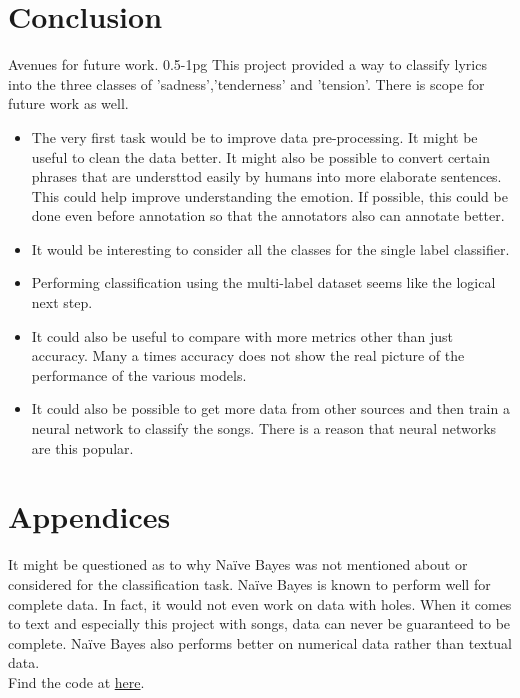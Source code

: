 \documentclass[11pt,a4paper]{article}
\begin{document}
\section{Conclusion}
\label{conclusion}
Avenues for future work. 0.5-1pg
This project provided a way to classify lyrics into the three classes of 'sadness','tenderness' and 'tension'. There is scope for future work as well.
\begin{itemize}
  \item The very first task would be to improve data pre-processing. It might be useful to clean the data better. It might also be possible to convert certain phrases that are understtod easily by humans into more elaborate sentences. This could help improve understanding the emotion. If possible, this could be done even before annotation so that the annotators also can annotate better.
  \item It would be interesting to consider all the classes for the single label classifier. 
  \item Performing classification using the multi-label dataset seems like the logical next step. 
  \item It could also be useful to compare with more metrics other than just accuracy. Many a times accuracy does not show the real picture of the performance of the various models. 
  \item It could also be possible to get more data from other sources and then train a neural network to classify the songs. There is a reason that neural networks are this popular.
\end{itemize}




\appendix

\section{Appendices}
\label{sec:appendix}

It might be questioned as to why Naïve Bayes was not mentioned about or considered for the classification task. Naïve Bayes is known to perform well for complete data. In fact, it would not even work on data with holes. When it comes to text and especially this project with songs, data can never be guaranteed to be complete. Naïve Bayes also performs better on numerical data rather than textual data.\\
Find the code at \href{https://github.com/raviabhiram/mood-classification-with-lyrics}{here}.
\end{document}

